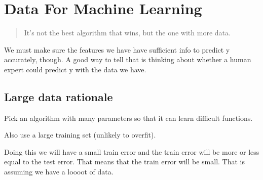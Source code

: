 \documentclass[11pt]{extarticle}
\begin{document}
\section{Data For Machine Learning}\label{data-for-machine-learning}

\begin{quote}
It's not the best algorithm that wins, but the one with more data.
\end{quote}

We must make sure the features we have have sufficient info to predict y
accurately, though. A good way to tell that is thinking about whether a
human expert could predict y with the data we have.

\subsection{Large data rationale}\label{large-data-rationale}

Pick an algorithm with many parameters so that it can learn difficult
functions.

Also use a large training set (unlikely to overfit).

Doing this we will have a small train error and the train error will be
more or less equal to the test error. That means that the train error
will be small. That is assuming we have a loooot of data.




    \nocite{*}



\end{document}
